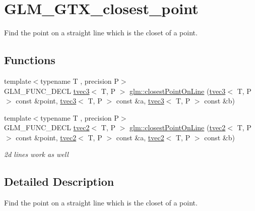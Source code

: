 \hypertarget{group__gtx__closest__point}{}\section{G\+L\+M\+\_\+\+G\+T\+X\+\_\+closest\+\_\+point}
\label{group__gtx__closest__point}


Find the point on a straight line which is the closet of a point.  


\subsection*{Functions}
\begin{DoxyCompactItemize}
\item 
{\footnotesize template$<$typename T , precision P$>$ }\\G\+L\+M\+\_\+\+F\+U\+N\+C\+\_\+\+D\+E\+CL \hyperlink{structglm_1_1tvec3}{tvec3}$<$ T, P $>$ \hyperlink{group__gtx__closest__point_gac26353282a8213e469f5e33560c1200f}{glm\+::closest\+Point\+On\+Line} (\hyperlink{structglm_1_1tvec3}{tvec3}$<$ T, P $>$ const \&point, \hyperlink{structglm_1_1tvec3}{tvec3}$<$ T, P $>$ const \&a, \hyperlink{structglm_1_1tvec3}{tvec3}$<$ T, P $>$ const \&b)
\item 
\mbox{\label{group__gtx__closest__point_gadc7010070bb0cacd284f560299b21660}} 
{\footnotesize template$<$typename T , precision P$>$ }\\G\+L\+M\+\_\+\+F\+U\+N\+C\+\_\+\+D\+E\+CL \hyperlink{structglm_1_1tvec2}{tvec2}$<$ T, P $>$ \hyperlink{group__gtx__closest__point_gadc7010070bb0cacd284f560299b21660}{glm\+::closest\+Point\+On\+Line} (\hyperlink{structglm_1_1tvec2}{tvec2}$<$ T, P $>$ const \&point, \hyperlink{structglm_1_1tvec2}{tvec2}$<$ T, P $>$ const \&a, \hyperlink{structglm_1_1tvec2}{tvec2}$<$ T, P $>$ const \&b)
\begin{DoxyCompactList}\small\item\em 2d lines work as well \end{DoxyCompactList}\end{DoxyCompactItemize}


\subsection{Detailed Description}
Find the point on a straight line which is the closet of a point. 

